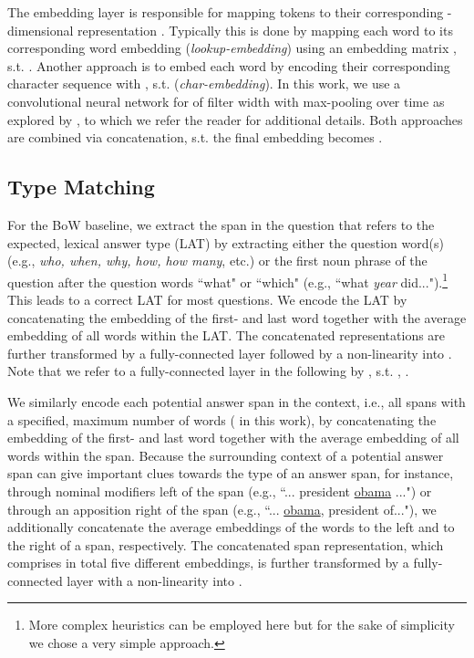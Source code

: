 \documentclass[11pt,a4paper]{article}
\begin{document}
The embedding layer is responsible for mapping tokens  to their corresponding -dimensional representation . Typically this is done by mapping each word  to its corresponding word embedding  (\textit{lookup-embedding}) using an embedding matrix , s.t. . Another approach is to embed each word by encoding their corresponding character sequence  with , s.t.  (\textit{char-embedding}). In this work, we use a convolutional neural network for  of filter width  with max-pooling over time as explored by , to which we refer the reader for additional details. Both approaches are combined via concatenation, s.t. the final embedding becomes .


\subsection{Type Matching}
For the BoW baseline, we extract the span in the question that refers to the expected, lexical answer type (LAT) by extracting either the question word(s) (e.g., \textit{who, when, why, how, how many}, etc.) or the first noun phrase of the question after the question words ``what" or ``which" (e.g., ``what \textit{year} did...").\footnote{More complex heuristics can be employed here but for the sake of simplicity we chose a very simple approach.} This leads to a correct LAT for most questions. We encode the LAT by concatenating the embedding of the first- and last word together with the average embedding of all words within the LAT. The concatenated representations are further transformed by a fully-connected layer followed by a  non-linearity into . Note that we refer to a fully-connected layer in the following by , s.t. , .

We similarly encode each potential answer span  in the context, i.e., all spans with a specified, maximum number of words ( in this work), by concatenating the embedding of the first- and last word together with the average embedding of all words within the span. Because the surrounding context of a potential answer span can give important clues towards the type of an answer span, for instance, through nominal modifiers left of the span (e.g., ``... president \underline{obama} ...") or through an apposition right of the span (e.g., ``... \underline{obama}, president of..."), we additionally concatenate the average embeddings of the  words to the left and to the right of a span, respectively. The concatenated span representation, which comprises in total five different embeddings, is further transformed by a fully-connected layer with a  non-linearity into .
\end{document}

